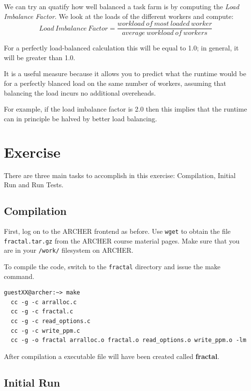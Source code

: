 \documentclass{article}
\begin{document}
We can try an quatify how well balanced a task farm is by computing
the {\em Load Imbalance Factor}. We look at the loads of the different workers and compute:
\[
Load\ Imbalance\ Factor = \frac{workload\ of\ most\ loaded\ worker}{average\ workload\ of\ workers}
\]

For a perfectly load-balanced calculation this will be equal to 1.0;
in general, it will be greater than 1.0.

It is a useful measure because it allows you to predict what the
runtime would be for a perfectly blanced load on the same number of
workers, assuming that balancing the load incurs no additional
overeheads.

For example, if the load imbalance factor is 2.0 then this implies
that the runtime can in principle be halved by better load balancing.

\newpage

\section{Exercise}

There are three main tasks to accomplish in this exercise: Compilation,
Initial Run and Run Tests.

\subsection{Compilation}

First, log on to the ARCHER frontend as before. Use \verb+wget+ to
obtain the file \verb+fractal.tar.gz+ from the ARCHER course material
pages. Make sure that you are in your \verb+/work/+ filesystem on
ARCHER.

To compile the code, switch to the {\verb+fractal+}
directory and issue the make command.

\begin{lstlisting}[frame=single]
  guestXX@archer:~> make
  cc -g -c arralloc.c
  cc -g -c fractal.c
  cc -g -c read_options.c
  cc -g -c write_ppm.c
  cc -g -o fractal arralloc.o fractal.o read_options.o write_ppm.o -lm
\end{lstlisting}

After compilation a executable file will have been created called \textbf{fractal}.

\subsection{Initial Run}
\end{document}
